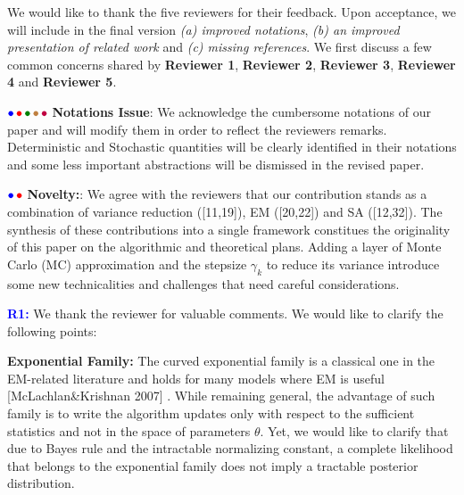 \documentclass{article}
\begin{document}
We would like to thank the five reviewers for their feedback. Upon acceptance, we will include in the final version \emph{{\sf (a)} improved notations}, \emph{{\sf (b)} an improved presentation of related work} and \emph{{\sf (c)} missing references}. 
We first discuss a few common concerns shared by \textbf{\color{blue}Reviewer 1}, \textbf{\color{red} Reviewer 2}, \textbf{\color{green!50!black}Reviewer 3}, \textbf{\color{brown}Reviewer 4} and \textbf{\color{purple}Reviewer 5}.

${\color{blue}\bullet}\!~{\color{red}\bullet}\!~{\color{green!50!black}\bullet}\!~{\color{brown}\bullet}\!~{\color{purple}\bullet}$ \textbf{Notations Issue}: 
We acknowledge the cumbersome notations of our paper and will modify them in order to reflect the reviewers remarks. 
Deterministic and Stochastic quantities will be clearly identified in their notations and some less important abstractions will be dismissed in the revised paper.


${\color{blue}\bullet}\!~{\color{red}\bullet}$ \textbf{Novelty:}: 
We agree with the reviewers that our contribution stands as a combination of variance reduction ([11,19]), EM ([20,22]) and SA ([12,32]). 
The synthesis of these contributions into a single framework constitues the originality of this paper on the algorithmic and theoretical plans.
Adding a layer of Monte Carlo (MC) approximation and the stepsize $\gamma_k$ to reduce its variance introduce some new technicalities and challenges that need careful considerations.\vspace{-0.05in}


\textbf{\textcolor{blue}{R1:}} We thank the reviewer for valuable comments. We would like to clarify the following points:\vspace{-0.05in}


\textbf{Exponential Family:} 
The curved exponential family is a classical one in the EM-related literature and holds for many models where  EM is useful [McLachlan\&Krishnan 2007] . 
While remaining general, the advantage of such family is to write the algorithm updates only with respect to the sufficient statistics and not in the space of parameters $\theta$. 
Yet, we would like to clarify that due to Bayes rule and the intractable normalizing constant, a complete likelihood that belongs to the exponential family does not imply a tractable posterior distribution.\vspace{-0.05in}
\end{document}
